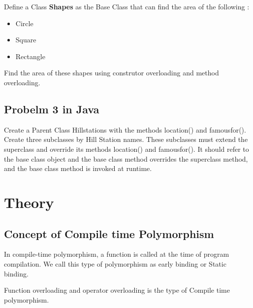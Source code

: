 \documentclass[11pt]{article}
\begin{document}
Define a Class \textbf{Shapes} as the Base Class that can find the area of the following :
\begin{itemize}
	\item Circle
	\item Square
	\item Rectangle
\end{itemize}

Find the area of these shapes using construtor overloading and method overloading.

\subsection{Probelm 3 in Java}
Create a Parent Class Hillstations with the methods location() and famousfor().
Create three subclasses by Hill Station names.
These subclasses must extend the superclass and override its methods location() and famousfor().
It should refer to the base class object and the base class method overrides the superclass method, and the base class method is invoked at runtime.

\section{Theory}

\subsection{Concept of Compile time Polymorphism}
In compile-time polymorphism, a function is called at the time of program compilation. We call this type of polymorphism as early binding or Static binding.

Function overloading and operator overloading is the type of Compile time polymorphism.
\end{document}
